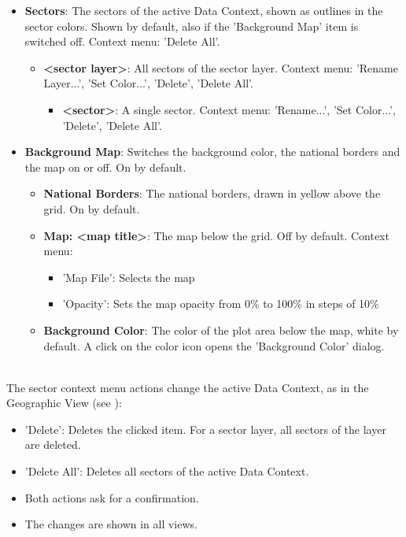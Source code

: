 \begin{itemize}
    \item \textbf{Sectors}: The sectors of the active Data Context, shown as outlines in the sector colors. Shown by default, also if the 'Background Map' item is switched off. Context menu: 'Delete All'.
    \begin{itemize}
        \item \textbf{<sector layer>}: All sectors of the sector layer. Context menu: 'Rename Layer...', 'Set Color...', 'Delete', 'Delete All'.
        \begin{itemize}
            \item \textbf{<sector>}: A single sector. Context menu: 'Rename...', 'Set Color...', 'Delete', 'Delete All'.
        \end{itemize}
    \end{itemize}
    \item \textbf{Background Map}: Switches the background color, the national borders and the map on or off. On by default.
    \begin{itemize}
        \item \textbf{National Borders}: The national borders, drawn in yellow above the grid. On by default.
        \item \textbf{Map: <map title>}: The map below the grid. Off by default. Context menu:
        \begin{itemize}
            \item 'Map File': Selects the map
            \item 'Opacity': Sets the map opacity from 0\% to 100\% in steps of 10\%
        \end{itemize}
        \item \textbf{Background Color}: The color of the plot area below the map, white by default. A click on the color icon opens the 'Background Color' dialog.
    \end{itemize}
\end{itemize}
\ \\

The sector context menu actions change the active Data Context, as in the Geographic View (see ):
\begin{itemize}
    \item 'Delete': Deletes the clicked item. For a sector layer, all sectors of the layer are deleted.
    \item 'Delete All': Deletes all sectors of the active Data Context.
    \item Both actions ask for a confirmation.
    \item The changes are shown in all views.
\end{itemize}
\ \\

